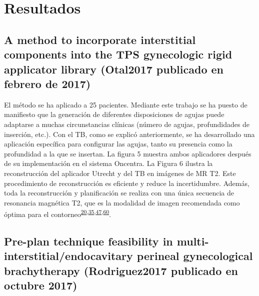 \documentclass[
  a4paper,
]{scrreprt}
\begin{document}
\newpage{}


\hypertarget{resultados}{%
\chapter{Resultados}\label{resultados}}

\hypertarget{sec-resultadosotal2017}{%
\section{A method to incorporate interstitial components into the TPS
gynecologic rigid applicator library (Otal2017 publicado en febrero de
2017)}\label{sec-resultadosotal2017}}

El método se ha aplicado a 25 pacientes. Mediante este trabajo se ha
puesto de manifiesto que la generación de diferentes disposiciones de
agujas puede adaptarse a muchas circunstancias clínicas (número de
agujas, profundidades de inserción, etc.). Con el TB, como se explicó
anteriormente, se ha desarrollado una aplicación específica para
configurar las agujas, tanto su presencia como la profundidad a la que
se insertan. La figura 5 muestra ambos aplicadores después de su
implementación en el sistema Oncentra. La Figura 6 ilustra la
reconstrucción del aplicador Utrecht y del TB en imágenes de MR T2. Este
procedimiento de reconstrucción es eficiente y reduce la incertidumbre.
Además, toda la reconstrucción y planificación se realiza con una única
secuencia de resonancia magnética T2, que es la modalidad de imagen
recomendada como óptima para el
contorneo\textsuperscript{\protect\hyperlink{ref-haie-meder2005}{20},\protect\hyperlink{ref-dimopoulos2012}{35},\protect\hyperlink{ref-viswanathan2012}{47},\protect\hyperlink{ref-potter2006}{60}}.

\hypertarget{pre-plan-technique-feasibility-in-multi-interstitialendocavitary-perineal-gynecological-brachytherapy-rodriguez2017-publicado-en-octubre-2017-1}{%
\section{Pre-plan technique feasibility in
multi-interstitial/endocavitary perineal gynecological brachytherapy
(Rodriguez2017 publicado en octubre
2017)}\label{pre-plan-technique-feasibility-in-multi-interstitialendocavitary-perineal-gynecological-brachytherapy-rodriguez2017-publicado-en-octubre-2017-1}}
\end{document}
